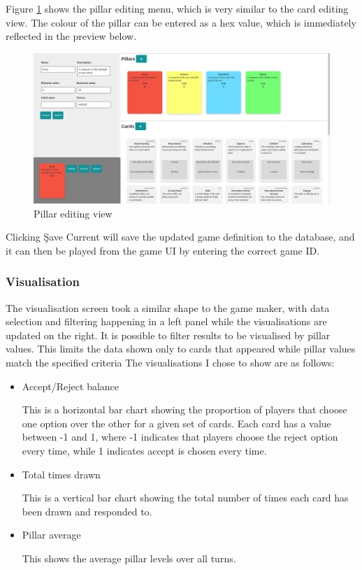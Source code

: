 Figure \ref{fig:pillar_edit} shows the pillar editing menu, which is very similar to the card editing view. The colour of the pillar can be entered as a hex value, which is immediately reflected in the preview below.

\begin{figure}[!h]
	\centering
	\includegraphics[width=1.0\textwidth]{./images/design/pillar_edit.png}
	\caption{Pillar editing view}
	\label{fig:pillar_edit}
\end{figure}

Clicking \c{Save Current} will save the updated game definition to the database, and it can then be played from the game UI by entering the correct game ID.

\subsubsection{Visualisation}

The visualisation screen took a similar shape to the game maker, with data selection and filtering happening in a left panel while the visualisations are updated on the right.
It is possible to filter results to be visualised by pillar values. This limits the data shown only to cards that appeared while pillar values match the specified criteria The visualisations I chose to show are as follows:
\begin{itemize}
    \item Accept/Reject balance

    This is a horizontal bar chart showing the proportion of players that choose one option over the other for a given set of cards. Each card has a value between -1 and 1, where -1 indicates that players choose the reject option every time, while 1 indicates accept is chosen every time.

    \item Total times drawn
    
    This is a vertical bar chart showing the total number of times each card has been drawn and responded to.
    
    \item Pillar average

    This shows the average pillar levels over all turns.
\end{itemize}

